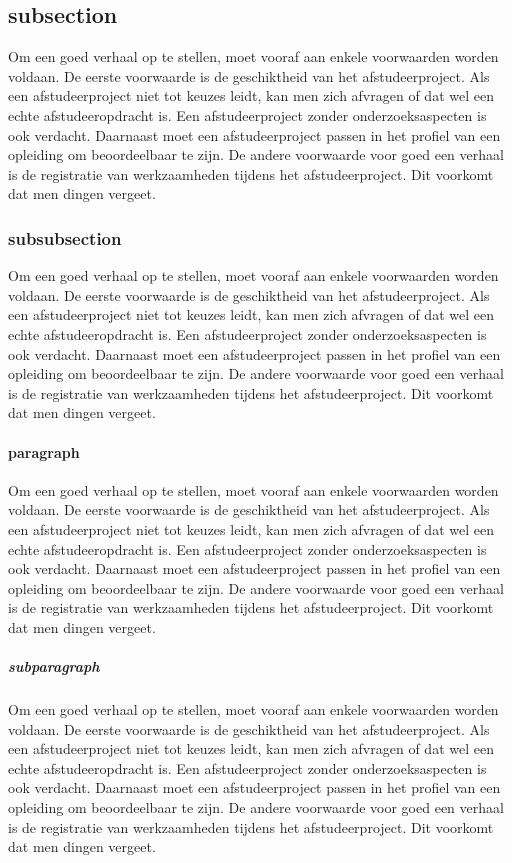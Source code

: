 		\subsection{subsection}
		
		Om een goed verhaal op te stellen, moet vooraf aan enkele voorwaarden
		worden voldaan. De eerste voorwaarde is de geschiktheid van het
		afstudeerproject. Als een afstudeerproject niet tot keuzes leidt, kan
		men zich afvragen of dat wel een echte afstudeeropdracht is. Een
		afstudeerproject zonder onderzoeksaspecten is ook verdacht. Daarnaast
		moet een afstudeerproject passen in het profiel van een opleiding om
		beoordeelbaar te zijn. De andere voorwaarde voor goed een verhaal is
		de registratie van werkzaamheden tijdens het afstudeerproject. Dit
		voorkomt dat men dingen vergeet.
		\subsubsection{subsubsection}
		
		Om een goed verhaal op te stellen, moet vooraf aan enkele voorwaarden
		worden voldaan. De eerste voorwaarde is de geschiktheid van het
		afstudeerproject. Als een afstudeerproject niet tot keuzes leidt, kan
		men zich afvragen of dat wel een echte afstudeeropdracht is. Een
		afstudeerproject zonder onderzoeksaspecten is ook verdacht. Daarnaast
		moet een afstudeerproject passen in het profiel van een opleiding om
		beoordeelbaar te zijn. De andere voorwaarde voor goed een verhaal is
		de registratie van werkzaamheden tijdens het afstudeerproject. Dit
		voorkomt dat men dingen vergeet.
		\paragraph{paragraph}
		
		Om een goed verhaal op te stellen, moet vooraf aan enkele voorwaarden
		worden voldaan. De eerste voorwaarde is de geschiktheid van het
		afstudeerproject. Als een afstudeerproject niet tot keuzes leidt, kan
		men zich afvragen of dat wel een echte afstudeeropdracht is. Een
		afstudeerproject zonder onderzoeksaspecten is ook verdacht. Daarnaast
		moet een afstudeerproject passen in het profiel van een opleiding om
		beoordeelbaar te zijn. De andere voorwaarde voor goed een verhaal is
		de registratie van werkzaamheden tijdens het afstudeerproject. Dit
		voorkomt dat men dingen vergeet.
		\subparagraph{subparagraph}
		
		Om een goed verhaal op te stellen, moet vooraf aan enkele voorwaarden
		worden voldaan. De eerste voorwaarde is de geschiktheid van het
		afstudeerproject. Als een afstudeerproject niet tot keuzes leidt, kan
		men zich afvragen of dat wel een echte afstudeeropdracht is. Een
		afstudeerproject zonder onderzoeksaspecten is ook verdacht. Daarnaast
		moet een afstudeerproject passen in het profiel van een opleiding om
		beoordeelbaar te zijn. De andere voorwaarde voor goed een verhaal is
		de registratie van werkzaamheden tijdens het afstudeerproject. Dit
		voorkomt dat men dingen vergeet.
		
